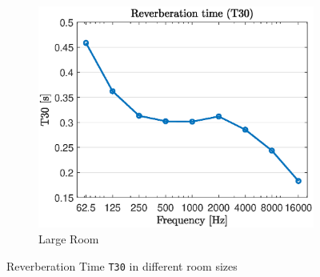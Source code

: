 \documentclass[a4paper,twoside,12pt,hidelinks]{article}
\begin{document}
\begin{figure}[H]
\begin{subfigure}[H]{0.3\textwidth}
\includegraphics[width=\textwidth]{t30l}
\caption{Large Room}
\end{subfigure}
\caption{Reverberation Time \texttt{T30} in different room sizes}
\label{fig:reverb}
\end{figure}
\end{document}
